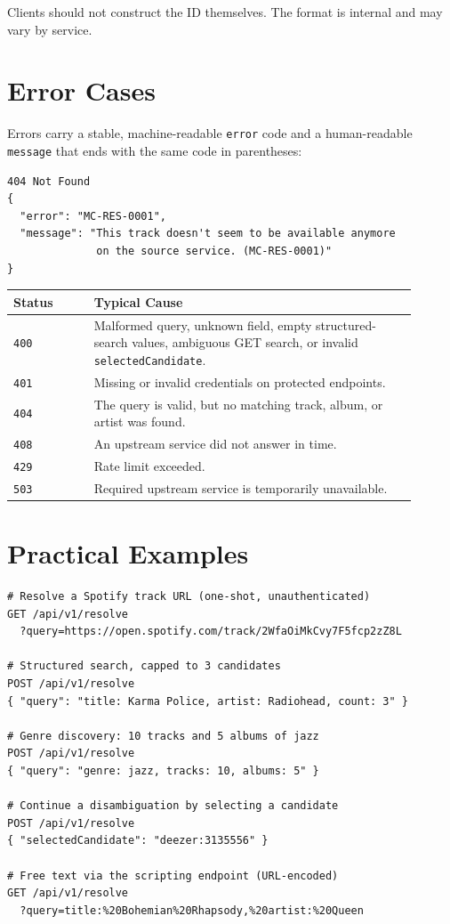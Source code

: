 \documentclass[11pt,a4paper]{article}
\newcommand{\code}[1]{\texttt{#1}}
\begin{document}
Clients should not construct the ID themselves. The format is internal and may vary by service.

\section{Error Cases}

Errors carry a stable, machine-readable \code{error} code and a human-readable \code{message} that ends with the same code in parentheses:

\begingroup\small\begin{verbatim}
404 Not Found
{
  "error": "MC-RES-0001",
  "message": "This track doesn't seem to be available anymore
              on the source service. (MC-RES-0001)"
}
\end{verbatim}\endgroup

\begin{longtable}{>{\raggedright\arraybackslash}p{0.18\linewidth}>{\raggedright\arraybackslash}p{0.72\linewidth}}
\textbf{Status} & \textbf{Typical Cause} \\
\hline
\code{400} & Malformed query, unknown field, empty structured-search values, ambiguous GET search, or invalid \code{selectedCandidate}. \\
\code{401} & Missing or invalid credentials on protected endpoints. \\
\code{404} & The query is valid, but no matching track, album, or artist was found. \\
\code{408} & An upstream service did not answer in time. \\
\code{429} & Rate limit exceeded. \\
\code{503} & Required upstream service is temporarily unavailable. \\
\end{longtable}

\section{Practical Examples}

\begingroup\small\begin{verbatim}
# Resolve a Spotify track URL (one-shot, unauthenticated)
GET /api/v1/resolve
  ?query=https://open.spotify.com/track/2WfaOiMkCvy7F5fcp2zZ8L

# Structured search, capped to 3 candidates
POST /api/v1/resolve
{ "query": "title: Karma Police, artist: Radiohead, count: 3" }

# Genre discovery: 10 tracks and 5 albums of jazz
POST /api/v1/resolve
{ "query": "genre: jazz, tracks: 10, albums: 5" }

# Continue a disambiguation by selecting a candidate
POST /api/v1/resolve
{ "selectedCandidate": "deezer:3135556" }

# Free text via the scripting endpoint (URL-encoded)
GET /api/v1/resolve
  ?query=title:%20Bohemian%20Rhapsody,%20artist:%20Queen
\end{verbatim}\endgroup
\end{document}
